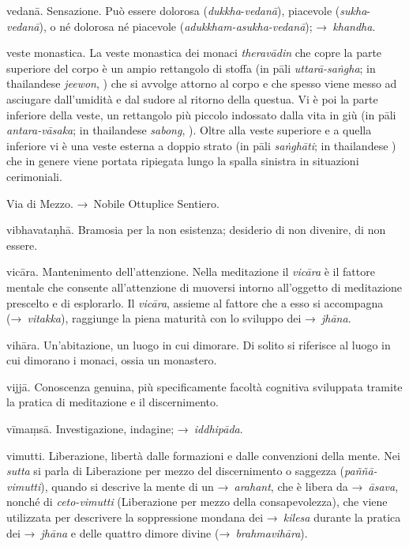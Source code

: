 \begin{glossarydescription}
\item[vedanā.]\label{glossary-vedana} Sensazione. Può essere dolorosa
  (\emph{dukkha}-\emph{vedanā}), piacevole (\emph{sukha}-\emph{vedanā}), o né
  dolorosa né piacevole (\emph{adukkham-asukha-vedanā}); →~\emph{khandha}.

\item[veste monastica.] La veste monastica dei monaci \emph{theravādin} che copre
  la parte superiore del corpo è un ampio rettangolo di stoffa (in pāli
  \emph{uttarā-saṅgha}; in thailandese \emph{jeewon}, ) che si avvolge
  attorno al corpo e che spesso viene messo ad asciugare dall'umidità e dal
  sudore al ritorno della questua. Vi è poi la parte inferiore della veste, un
  rettangolo più piccolo indossato dalla vita in giù (in pāli
  \emph{antara-vāsaka}; in thailandese \emph{sabong}, ). Oltre alla
  veste superiore e a quella inferiore vi è una veste esterna a doppio strato
  (in pāli \emph{saṅghāti}; in thailandese ) che in
  genere viene portata ripiegata lungo la spalla sinistra in situazioni
  cerimoniali.

\item[Via di Mezzo.] →~Nobile Ottuplice Sentiero.

\item[vibhavataṇhā.] Bramosia per la non esistenza; desiderio di non
  divenire, di non essere.

\item[vicāra.] Mantenimento dell'attenzione. Nella meditazione il
  \emph{vicāra} è il fattore mentale che consente all'attenzione di muoversi
  intorno all'oggetto di meditazione prescelto e di esplorarlo. Il
  \emph{vicāra}, assieme al fattore che a esso si accompagna (→~\emph{vitakka}),
  raggiunge la piena maturità con lo sviluppo dei →~\emph{jhāna}.

\item[vihāra.] Un'abitazione, un luogo in cui dimorare. Di solito si
  riferisce al luogo in cui dimorano i monaci, ossia un monastero.

\item[vijjā.] Conoscenza genuina, più specificamente facoltà cognitiva
  sviluppata tramite la pratica di meditazione e il discernimento.

\item[vīmaṃsā.] Investigazione, indagine; →~\emph{iddhipāda}.

\item[vimutti.] Liberazione, libertà dalle formazioni e dalle convenzioni
  della mente. Nei \emph{sutta} si parla di Liberazione per mezzo del
  discernimento o saggezza (\emph{paññā-vimutti}), quando si descrive la mente
  di un →~\emph{arahant}, che è libera da →~\emph{āsava}, nonché di
  \emph{ceto-vimutti} (Liberazione per mezzo della consapevolezza), che viene
  utilizzata per descrivere la soppressione mondana dei →~\emph{kilesa} durante
  la pratica dei →~\emph{jhāna} e delle quattro dimore divine
  (→~\emph{brahmavihāra}).


\end{glossarydescription}
